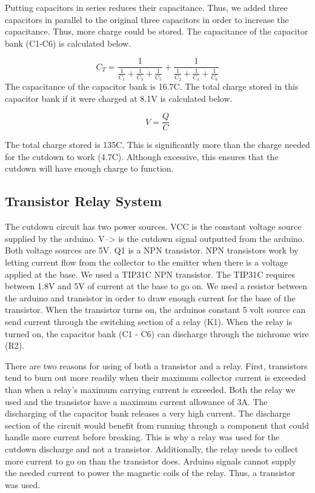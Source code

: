 \documentclass[12pt,]{article}
\begin{document}
Putting capacitors in series reduces their capacitance. Thus, we added
three capacitors in parallel to the original three capacitors in order
to increase the capacitance. Thus, more charge could be stored. The
capacitance of the capacitor bank (C1-C6) is calculated below.

\[C_{T} = \frac{1}{\frac{1}{C_{1}} + \frac{1}{C_{3}} + \frac{1}{C_{5}}}+\frac{1}{\frac{1}{C_{2}} + \frac{1}{C_{4}} + \frac{1}{C_{6}}}\]
The capacitance of the capacitor bank is 16.7C. The total charge stored
in this capacitor bank if it were charged at 8.1V is calculated below.

\[V=\frac{Q}{C}\]

The total charge stored is 135C. This is significantly more than the
charge needed for the cutdown to work (4.7C). Although excessive, this
ensures that the cutdown will have enough charge to function.

\subsection{Transistor Relay System}\label{transistor-relay-system}

The cutdown circuit has two power sources. VCC is the constant voltage
source supplied by the arduino. V--\textgreater{} is the cutdown signal
outputted from the arduino. Both voltage sources are 5V. Q1 is a NPN
transistor. NPN transistors work by letting current flow from the
collector to the emitter when there is a voltage applied at the base. We
used a TIP31C NPN transistor. The TIP31C requires between 1.8V and 5V of
current at the base to go on. We used a resistor between the arduino and
transistor in order to draw enough current for the base of the
transistor. When the transistor turns on, the arduinos constant 5 volt
source can send current through the switching section of a relay (K1).
When the relay is turned on, the capacitor bank (C1 - C6) can discharge
through the nichrome wire (R2).

There are two reasons for using of both a transistor and a relay. First,
transistors tend to burn out more readily when their maximum collector
current is exceeded than when a relay's maximum carrying current is
exceeded. Both the relay we used and the transistor have a maximum
current allowance of 3A. The discharging of the capacitor bank releases
a very high current. The discharge section of the circuit would benefit
from running through a component that could handle more current before
breaking. This is why a relay was used for the cutdown discharge and not
a transistor. Additionally, the relay needs to collect more current to
go on than the transistor does. Arduino signals cannot supply the needed
current to power the magnetic coils of the relay. Thus, a transistor was
used.
\end{document}
